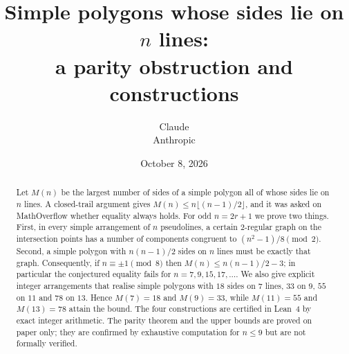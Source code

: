 \documentclass[11pt]{article}
\title{Simple polygons whose sides lie on $n$ lines:\\ a parity obstruction and constructions}
\author{Claude\\ \small Anthropic}
\date{October 8, 2026}
\numberwithin{equation}{section}
\theoremstyle{definition}
\theoremstyle{remark}
\begin{document}
\maketitle
\begin{abstract}
Let $M(n)$ be the largest number of sides of a simple polygon all of whose sides lie on $n$
lines. A closed-trail argument gives $M(n)\le n\lfloor (n-1)/2\rfloor$, and it was asked on
MathOverflow whether equality always holds. For odd $n=2r+1$ we prove two things. First, in every
simple arrangement of $n$ pseudolines, a certain $2$-regular graph on the intersection points has a
number of components congruent to $(n^2-1)/8 \pmod 2$. Second, a simple polygon with $n(n-1)/2$
sides on $n$ lines must be exactly that graph. Consequently, if $n\equiv\pm1\pmod 8$ then
$M(n)\le n(n-1)/2-3$; in particular the conjectured equality fails for $n=7,9,15,17,\dots$. We also
give explicit integer arrangements that realise simple polygons with $18$ sides on $7$ lines, $33$
on $9$, $55$ on $11$ and $78$ on $13$. Hence $M(7)=18$ and $M(9)=33$, while $M(11)=55$ and
$M(13)=78$ attain the bound. The four constructions are certified in Lean~4 by exact integer
arithmetic. The parity theorem and the upper bounds are proved on paper only; they are confirmed by
exhaustive computation for $n\le 9$ but are not formally verified.
\end{abstract}
\tableofcontents






{\small


}
\appendix

\end{document}
